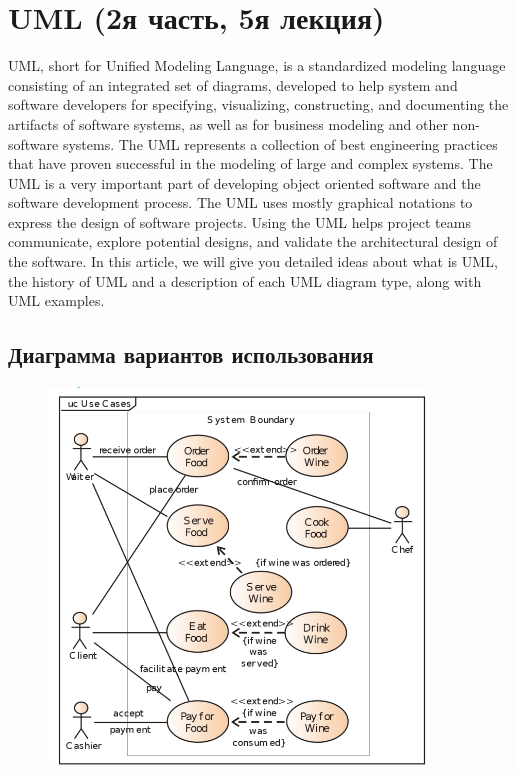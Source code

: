 \documentclass[12pt; a4paper]{book}
\theoremstyle{plain} %
\theoremstyle{defenition}
\theoremstyle{remark}
\begin{document}
\section{UML  (2я часть,  5я лекция)}
UML, short for Unified Modeling Language, is a standardized modeling language consisting of an integrated set of diagrams, developed to help system and software developers for specifying, visualizing, constructing, and documenting the artifacts of software systems, as well as for business modeling and other non-software systems. The UML represents a collection of best engineering practices that have proven successful in the modeling of large and complex systems. The UML is a very important part of developing object oriented software and the software development process. The UML uses mostly graphical notations to express the design of software projects. Using the UML helps project teams communicate, explore potential designs, and validate the architectural design of the software. In this article, we will give you detailed ideas about what is UML, the history of UML and a description of each UML diagram type, along with UML examples.\\
\newpage
\subsection{Диаграмма вариантов использования}
\begin{figure}[!hbp]
\includegraphics[angle=0, width=0.9\textwidth]{IMG/1} 
\end{figure}
\newpage
\end{document}
